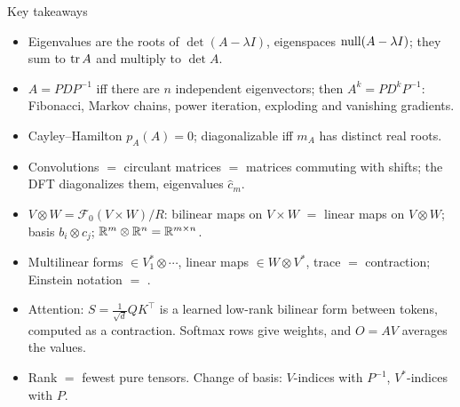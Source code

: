 \documentclass[aspectratio=1610,11pt]{beamer}
\begin{document}
\begin{frame}{Key takeaways}
    \small
    \begin{itemize}
        \item Eigenvalues are the roots of $\det(A - \lambda I)$, eigenspaces $\operatorname{null}(A - \lambda I)$; they sum to $\operatorname{tr} A$ and multiply to $\det A$.
        \item $A = PDP^{-1}$ iff there are $n$ independent eigenvectors; then $A^k = PD^kP^{-1}$: Fibonacci, Markov chains, power iteration, exploding and vanishing gradients.
        \item Cayley--Hamilton $p_A(A) = 0$; diagonalizable iff $m_A$ has distinct real roots.
        \item Convolutions $=$ circulant matrices $=$ matrices commuting with shifts; the DFT diagonalizes them, eigenvalues $\hat c_m$.
        \item $V \otimes W = \mathcal{F}_0(V \times W)/R$: bilinear maps on $V \times W$ $=$ linear maps on $V \otimes W$; basis $b_i \otimes c_j$; $\mathbb{R}^m \otimes \mathbb{R}^n = \mathbb{R}^{m \times n}$.
        \item Multilinear forms $\in V_1^* \otimes \cdots$, linear maps $\in W \otimes V^*$, trace $=$ contraction; Einstein notation $=$ .
        \item Attention: $S = \frac{1}{\sqrt d}QK^\top$ is a learned low-rank bilinear form between tokens, computed as a contraction. Softmax rows give weights, and $O = AV$ averages the values.
        \item Rank $=$ fewest pure tensors. Change of basis: $V$-indices with $P^{-1}$, $V^*$-indices with $P$.
    \end{itemize}
\end{frame}

\end{document}
